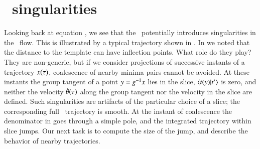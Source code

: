 	
\section{\Slice\ singularities}
\label{sect:sliceSing}

Looking back at equation ,
we see that the \mslices\ potentially introduces singularities
in the \reducedsp\ flow.
This is illustrated by a typical trajectory
shown in .
%
In  we noted that the distance to the template
can have inflection points.
What role do they play? They are non-generic, but
if we consider projections of successive instants of a trajectory
$x(\tau)$, coalescence of
nearby minima pairs cannot be avoided.
At these instants the group tangent of a point
$y=g^{-1} x$ lies in the slice, $\braket{\groupTan(\sspRed)}{\sliceTan{}}$ is zero,
and neither the velocity $\dot{{\bf \theta}}(\tau)$ along the group tangent
nor the velocity in the slice are defined.
Such singularities are artifacts of the particular choice of
a slice; the corresponding full \statesp\ trajectory is smooth. At the instant of coalescence
the denominator in  goes through a simple pole,
and the integrated trajectory within slice jumps. Our next task is
to compute the size of the jump, and describe the behavior of
nearby trajectories.



